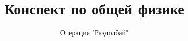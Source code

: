 \documentclass[13pt]{article}
\title{Конспект по общей физике}
\author{Операция "Раздолбай"}
\date{}
\begin{document}
\maketitle


\pagebreak

\pagebreak

\pagebreak

\pagebreak

\end{document}
